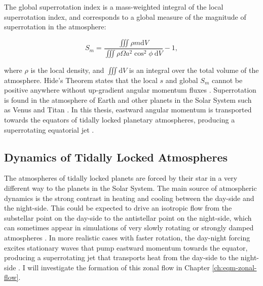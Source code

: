 The global superrotation index is a mass-weighted integral of the local superrotation index, and corresponds to a global measure of the magnitude of superrotation in the atmosphere:

\begin{equation}
  S_{m}=\frac{\iiint \rho m \mathrm{d} V}{\iiint \rho \Omega a^{2} \cos ^{2} \phi\ \mathrm{d} V}-1,
\end{equation}

where $\rho$ is the local density, and $\iiint \mathrm{d} V$ is an integral over the total volume of the atmosphere. Hide's Theorem states that the local $s$ and global $S_{m}$ cannot be positive anywhere without up-gradient angular momentum fluxes \citep{hide1969dynamics}. Superrotation is found in the atmosphere of Earth and other planets in the Solar System such as Venus and Titan \citep{laraia2015superrotation, read2018superrotation, sugimoto2019fully}. In this thesis, eastward angular momentum is transported towards the equators of tidally locked planetary atmospheres, producing a superrotating equatorial jet \citep{showman2011superrotation}.

\subsection{Dynamics of Tidally Locked Atmospheres}

The atmospheres of tidally locked planets are forced by their star in a very different way to the planets in the Solar System. The main source of atmospheric dynamics is the strong contrast in heating and cooling between the day-side and the night-side. This could be expected to drive an isotropic flow from the substellar point on the day-side to the antistellar point on the night-side, which can sometimes appear in simulations of very slowly rotating or strongly damped atmospheres \citep{pierrehumbert2018review, arcangeli2019climate}. In more realistic cases with faster rotation, the day-night forcing excites stationary waves that pump eastward momentum towards the equator, producing a superrotating jet that transports heat from the day-side to the night-side \citep{showman2011superrotation}. I will investigate the formation of this zonal flow in Chapter \ref{ch:eqm-zonal-flow}.

